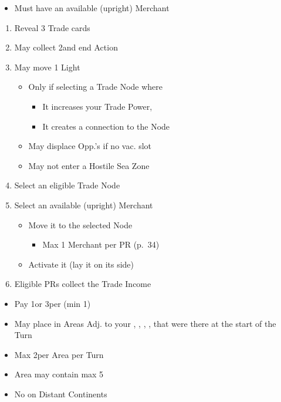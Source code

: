 \documentclass[10pt]{article}
\begin{document}
\begin{itemize}
	\item Must have an available (upright) Merchant
\end{itemize}
\begin{enumerate}
	\item Reveal 3 Trade cards
	\item May collect 2\ducats and end Action
	\item May move 1 Light \ship
	\begin{itemize}
		\item Only if selecting a Trade Node where
		\begin{itemize}
			\item It increases your Trade Power, 
			\item It creates a connection to the Node
		\end{itemize}
		\item May displace Opp.'s \ship if no vac. slot
		\item May not enter a Hostile Sea Zone
	\end{itemize}
	\item Select an eligible Trade Node
	\item Select an available (upright) Merchant
	\begin{itemize}
		\item Move it to the selected Node
		\begin{itemize}
			\item Max 1 Merchant per PR (p.~34)
		\end{itemize}
		\item Activate it (lay it on its side)
	\end{itemize}
	\item Eligible PRs collect the Trade Income
\end{enumerate}

\begin{itemize}
	\item Pay 1\diplopower or 3\ducats per \influence (min 1\diplopower)
	\item May place \influence in Areas Adj. to your \towns, \vassals, \alliances, \marriages, \influence that were there at the start of the Turn
	\item Max 2\influence per Area per Turn
	\item Area may contain max 5\influence
	\item No \influence on Distant Continents
\end{itemize}
\end{document}
